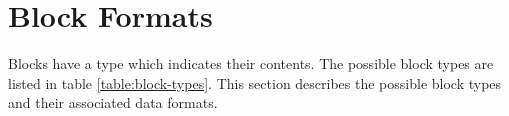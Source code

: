 \def\blocktimestampexp{
    \paragraph{Measurement Time}
    A signed 16 bit integer in units of milliseconds. This timestamp is meant to be added as an offset to the base
    timestamp in the packet header. This is explained in section \ref{sec:pkt-hdr}.
}

\section{Block Formats} \label{sec:block-formats}

Blocks have a type which indicates their contents. The possible block types are listed in table
\ref{table:block-types}. This section describes the possible block types and their associated data formats.












